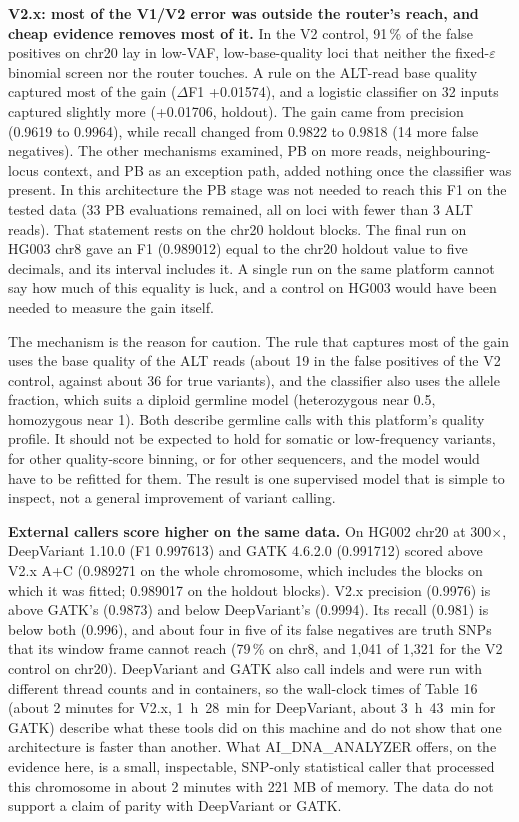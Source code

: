 \documentclass[11pt,a4paper]{article}
\begin{document}
\textbf{V2.x: most of the V1/V2 error was outside the router's reach, and cheap evidence removes most of it.} In the V2 control, 91\,\% of the false positives on chr20 lay in low-VAF, low-base-quality loci that neither the fixed-$\varepsilon$ binomial screen nor the router touches. A rule on the ALT-read base quality captured most of the gain ($\Delta$F1 +0.01574), and a logistic classifier on 32 inputs captured slightly more (+0.01706, holdout). The gain came from precision (0.9619 to 0.9964), while recall changed from 0.9822 to 0.9818 (14 more false negatives). The other mechanisms examined, PB on more reads, neighbouring-locus context, and PB as an exception path, added nothing once the classifier was present. In this architecture the PB stage was not needed to reach this F1 on the tested data (33 PB evaluations remained, all on loci with fewer than 3 ALT reads). That statement rests on the chr20 holdout blocks. The final run on HG003 chr8 gave an F1 (0.989012) equal to the chr20 holdout value to five decimals, and its interval includes it. A single run on the same platform cannot say how much of this equality is luck, and a control on HG003 would have been needed to measure the gain itself.

The mechanism is the reason for caution. The rule that captures most of the gain uses the base quality of the ALT reads (about 19 in the false positives of the V2 control, against about 36 for true variants), and the classifier also uses the allele fraction, which suits a diploid germline model (heterozygous near 0.5, homozygous near 1). Both describe germline calls with this platform's quality profile. It should not be expected to hold for somatic or low-frequency variants, for other quality-score binning, or for other sequencers, and the model would have to be refitted for them. The result is one supervised model that is simple to inspect, not a general improvement of variant calling.

\textbf{External callers score higher on the same data.} On HG002 chr20 at 300$\times$, DeepVariant 1.10.0 (F1 0.997613) and GATK 4.6.2.0 (0.991712) scored above V2.x A+C (0.989271 on the whole chromosome, which includes the blocks on which it was fitted; 0.989017 on the holdout blocks). V2.x precision (0.9976) is above GATK's (0.9873) and below DeepVariant's (0.9994). Its recall (0.981) is below both (0.996), and about four in five of its false negatives are truth SNPs that its window frame cannot reach (79\,\% on chr8, and 1,041 of 1,321 for the V2 control on chr20). DeepVariant and GATK also call indels and were run with different thread counts and in containers, so the wall-clock times of Table 16 (about 2 minutes for V2.x, 1~h~28~min for DeepVariant, about 3~h~43~min for GATK) describe what these tools did on this machine and do not show that one architecture is faster than another. What AI\_DNA\_ANALYZER offers, on the evidence here, is a small, inspectable, SNP-only statistical caller that processed this chromosome in about 2 minutes with 221 MB of memory. The data do not support a claim of parity with DeepVariant or GATK.
\end{document}

